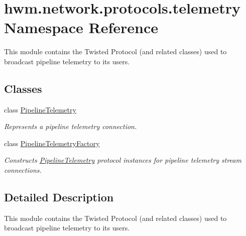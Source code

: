 \hypertarget{namespacehwm_1_1network_1_1protocols_1_1telemetry}{\section{hwm.\-network.\-protocols.\-telemetry Namespace Reference}
\label{namespacehwm_1_1network_1_1protocols_1_1telemetry}
}


This module contains the Twisted Protocol (and related classes) used to broadcast pipeline telemetry to its users.  


\subsection*{Classes}
\begin{DoxyCompactItemize}
\item 
class \hyperlink{classhwm_1_1network_1_1protocols_1_1telemetry_1_1_pipeline_telemetry}{Pipeline\-Telemetry}
\begin{DoxyCompactList}\small\item\em Represents a pipeline telemetry connection. \end{DoxyCompactList}\item 
class \hyperlink{classhwm_1_1network_1_1protocols_1_1telemetry_1_1_pipeline_telemetry_factory}{Pipeline\-Telemetry\-Factory}
\begin{DoxyCompactList}\small\item\em Constructs \hyperlink{classhwm_1_1network_1_1protocols_1_1telemetry_1_1_pipeline_telemetry}{Pipeline\-Telemetry} protocol instances for pipeline telemetry stream connections. \end{DoxyCompactList}\end{DoxyCompactItemize}


\subsection{Detailed Description}
This module contains the Twisted Protocol (and related classes) used to broadcast pipeline telemetry to its users. 